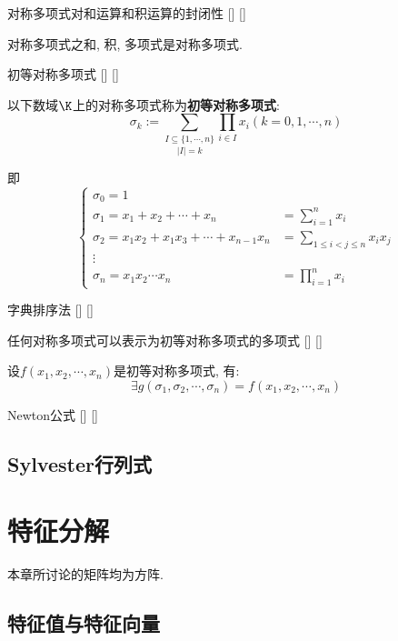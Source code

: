 \documentclass[UTF8]{ctexart}
\begin{document}
		\begin{ppt}
			[]
			{对称多项式对和运算和积运算的封闭性}
			[]
			[]

			对称多项式之和, 积, 多项式是对称多项式. 
		\end{ppt}
		
		\begin{dfn}
			[]
			{初等对称多项式}
			[]
			[]

			以下数域$\K$上的对称多项式称为\textbf{初等对称多项式}: 
			\[\sigma_k:=\underset{|I|=k}{\sum_{I\subseteq\{1,\cdots,n\}}}\prod_{i\in I} x_i(k=0,1,\cdots,n)\]
			
			即
			\[\begin{cases}
				\sigma_0=1\\
				\sigma_1=x_1+x_2+\cdots+x_n & =\sum\limits_{i=1}^n x_i\\
				\sigma_2=x_1 x_2+x_1 x_3+\cdots+x_{n-1}x_n & =\sum\limits_{1\leq i<j\leq n}x_i x_j\\
				\vdots\\
				\sigma_n=x_1 x_2 \cdots x_n & =\prod\limits_{i=1}^n x_i
			\end{cases}\]
		\end{dfn}
		
		\begin{dfn}
			[]
			{字典排序法}
			[]
			[]

		\end{dfn}
		
		\begin{thm}
			[]
			{任何对称多项式可以表示为初等对称多项式的多项式}
			[]
			[]

			设$f(x_1,x_2,\cdots,x_n)$是初等对称多项式, 有: 
			\[\exists g(\sigma_1,\sigma_2,\cdots,\sigma_n)=f(x_1,x_2,\cdots,x_n)\]
		\end{thm}
		
		\begin{thm}
			[]
			{Newton公式}
			[]
			[]

		\end{thm}
	
	\subsection{Sylvester行列式}
	
\section{特征分解}

	本章所讨论的矩阵均为方阵. 

	\subsection{特征值与特征向量}
		
\end{document}
